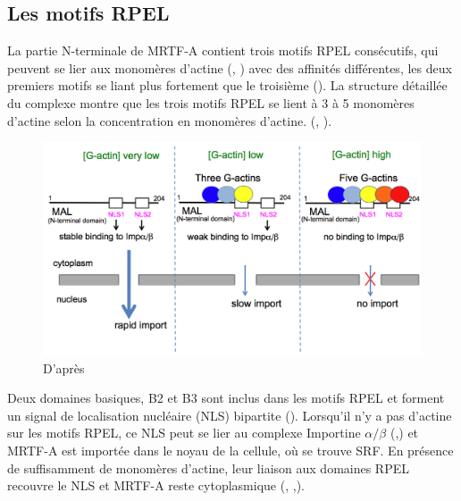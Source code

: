  \subsection{Les motifs RPEL}
 
 La partie N-terminale de MRTF-A contient trois motifs RPEL consécutifs, qui peuvent se lier aux monomères d'actine (\cite{posern_mutant_2004}, \cite{mouilleron_molecular_2008}) avec des affinités différentes, les deux premiers motifs se liant plus fortement que le troisième (\cite{guettler_rpel_2008}). La structure détaillée du complexe montre que les trois motifs RPEL se lient à 3 à 5 monomères d'actine selon la concentration en monomères d'actine. (\cite{hirano_sensing_2011}, \cite{treisman_structure_2011}). 
 
 
 \begin{figure}[h!]
 \includegraphics[scale=0.30]{MRTF-A_actines_complexes.png}
 \caption{D'après \cite{hirano_sensing_2011}\label{hirano}}
 \end{figure}
 Deux domaines basiques, B2 et B3 sont inclus dans les motifs RPEL et forment un signal de localisation nucléaire (NLS) bipartite (\cite{rajakyla_actin-regulated_2010}). Lorsqu'il n'y a pas d'actine sur les motifs RPEL, ce NLS peut se lier au complexe Importine $\alpha / \beta$ (\cite{hirano_sensing_2011},\cite{rajakyla_actin-regulated_2010}) et MRTF-A est importée dans le noyau de la cellule, où se trouve SRF. En présence de suffisamment de monomères d'actine, leur liaison aux domaines RPEL recouvre le NLS et MRTF-A reste cytoplasmique (\cite{posern_mutant_2002}, \cite{miralles_actin_2003},\cite{posern_mutant_2004}). 
 
